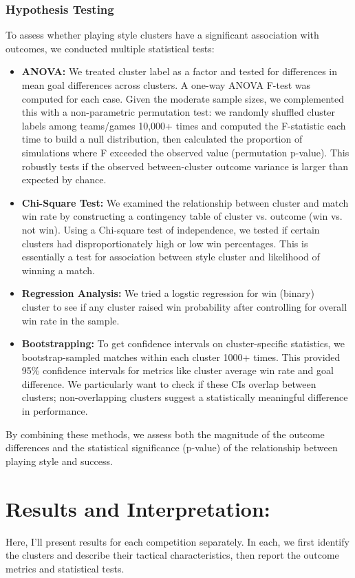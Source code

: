\documentclass[11pt]{article}
\begin{document}
\subsubsection*{Hypothesis Testing}
To assess whether playing style clusters have a significant association with outcomes, we conducted multiple statistical tests:
\begin{itemize}
    \item \textbf{ANOVA:} We treated cluster label as a factor and tested for differences in mean goal differences across clusters. A one-way ANOVA F-test was computed for each case. Given the moderate sample sizes, we complemented this with a non-parametric permutation test: we randomly shuffled cluster labels among teams/games 10,000+ times and computed the F-statistic each time to build a null distribution, then calculated the proportion of simulations where F exceeded the observed value (permutation p-value). This robustly tests if the observed between-cluster outcome variance is larger than expected by chance. 
    \item \textbf{Chi-Square Test:} We examined the relationship between cluster and match win rate by constructing a contingency table of cluster vs. outcome (win vs. not win). Using a Chi-square test of independence, we tested if certain clusters had disproportionately high or low win percentages. This is essentially a test for association between style cluster and likelihood of winning a match.  
    \item \textbf{Regression Analysis:} We tried a logstic regression for win (binary) ~ cluster to see if any cluster raised win probability after controlling for overall win rate in the sample. 

    \item \textbf{Bootstrapping:} To get confidence intervals on cluster-specific statistics, we bootstrap-sampled matches within each cluster 1000+ times. This provided 95\% confidence intervals for metrics like cluster average win rate and goal difference. We particularly want to check if these CIs overlap between clusters; non-overlapping clusters suggest a statistically meaningful difference in performance. 
\end{itemize}
By combining these methods, we assess both the magnitude of the outcome differences and the statistical significance (p-value) of the relationship between playing style and success. 

\section{Results and Interpretation:}
Here, I'll present results for each competition separately. In each, we first identify the clusters and describe their tactical characteristics, then report the outcome metrics and statistical tests. 
\end{document}
